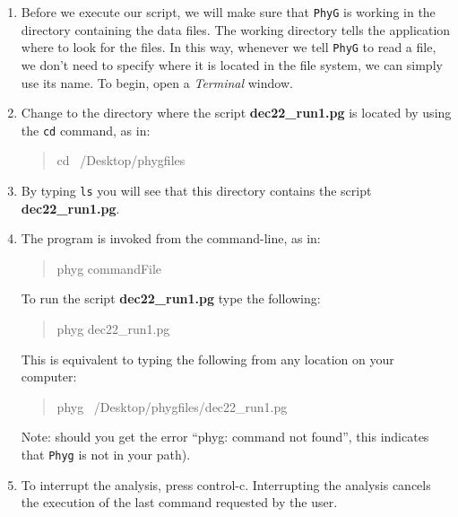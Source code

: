 \documentclass[11pt]{article}
\newcommand{\phyg}{\texttt{PhyG} }
\begin{document}
\begin{enumerate}

\item Before we execute our script, we will make sure that \phyg is working in the 
directory containing the data files. The working directory tells the application 
where to look for the files. In this way, whenever we tell \phyg to read a file, 
we don't need to specify where it is located in the file system, we can simply 
use its name. To begin, open a \emph{Terminal} window.
        
\item Change to the directory where the script \textbf{dec22\_run1.pg} is located by 
using the \texttt{cd} command, as in:
		
	\begin{quote}
	cd ~/Desktop/phygfiles
	\end{quote}
   
\item By typing \texttt{ls} you will see that this directory contains the script 
\textbf{dec22\_run1.pg}.

\item The program is invoked from the command-line, as in:
		
	\begin{quote}
	phyg commandFile
	\end{quote}
	
To run the script \textbf{dec22\_run1.pg} type the following:
		
	\begin{quote}
  	phyg dec22\_run1.pg
	\end{quote}
	
This is equivalent to typing the following from any location on your computer:
	
	\begin{quote}
  	phyg ~/Desktop/phygfiles/dec22\_run1.pg
	\end{quote}

Note: should you get the error ``phyg: command not found'', this indicates that 
\texttt{Phyg} is not in your path). 
	
\item To interrupt the analysis, press control-c. Interrupting the analysis cancels 
the execution of the last command requested by the user. 

\end{enumerate}

\end{document}
